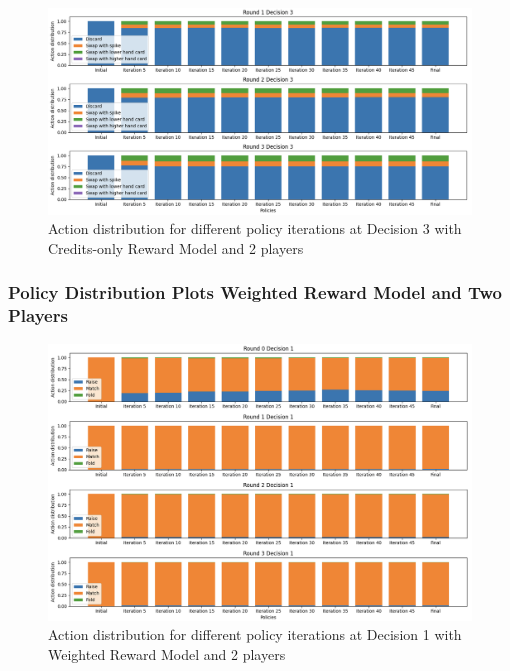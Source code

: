 \documentclass{article}
\begin{document}
    \begin{figure}[H]
    \centering
        \includegraphics[width=\textwidth]{report/figures/r_d3.png}
        \caption{Action distribution for different policy iterations at Decision 3 with Credits-only Reward Model and 2 players}
        \label{fig:dec3_distribution}
    \end{figure}

\subsubsection*{Policy Distribution Plots Weighted Reward Model and Two Players}
    \begin{figure}[H]
    \centering
        \includegraphics[width=\textwidth]{report/figures/weighted_r_d1.png}
        \caption{Action distribution for different policy iterations at Decision 1 with Weighted Reward Model and 2 players}
        \label{fig:weight_dec1_distribution}
    \end{figure}
    
\end{document}
